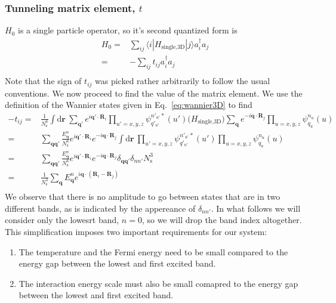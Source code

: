 \documentclass[11pt,letter]{article}
\newcommand{\bv}[1]{\ensuremath{\bm{#1}}}
\begin{document}
\subsubsection{Tunneling matrix element, $t$}
$H_{0}$ is a single particle operator, so it's second quantized form is 
\begin{equation}
\begin{split}
  H_{0} = & \sum_{ij} \langle i| H_{\text{single,3D}} |j \rangle a_{i}^{\dagger} a_{j} \\
        = & -\sum_{ij} t_{ij}  a_{i}^{\dagger} a_{j} \\
\end{split}
\end{equation}  
Note that the sign of $t_{ij}$ was picked rather arbitrarily to follow the
usual conventions.  We now proceed to find the value of the matrix element.
We use the definition of the Wannier states given in Eq.~\ref{eq:wannier3D} to
find 
\begin{equation}
\begin{split}
-t_{ij}  
= & 
  \frac{1}{N_{\mathrm{s}}^{6}}\int \mathrm{d}\bv{r}\ 
     \sum_{\bv{q}'} e^{i \bv{q'}\cdot\bv{R}_{i} }
     \prod_{u'=x,y,z}  \psi_{q'_{u'}}^{n'_{u'}*}(u') 
  \Big( H_{\text{single,3D}}  \Big)
     \sum_{\bv{q}} e^{-i \bv{q}\cdot\bv{R}_{j} }
     \prod_{u=x,y,z}  \psi_{q_{u}}^{n_{u}}(u)\\ 
= &
  \sum_{\bv{q}\bv{q}'}   
  \frac{E_{\bv{q}}^{n}}{N_{\mathrm{s}}^{6}}
   e^{ i \bv{q}'\cdot\bv{R}_{i} }  e^{ -i \bv{q}\cdot\bv{R}_{j} }
   \int\mathrm{d}\bv{r}\ 
     \prod_{u'=x,y,z}  \psi_{q'_{u'}}^{n'_{u'}*}(u') 
     \prod_{u=x,y,z}  \psi_{q_{u}}^{n_{u}}(u) \\ 
= &
  \sum_{\bv{q}\bv{q}'}   
  \frac{E_{\bv{q}}^{n}}{N_{\mathrm{s}}^{6}}
   e^{ i \bv{q}'\cdot\bv{R}_{i} }  e^{ -i \bv{q}\cdot\bv{R}_{j} }
   \delta_{\bv{q}\bv{q}'} \delta_{nn'} N_{\mathrm{s}}^{3} \\
= &
  \frac{1}{N_{\mathrm{s}}^{3}}
  \sum_{\bv{q}}   E_{\bv{q}}^{n}
   e^{ i \bv{q}\cdot(\bv{R}_{i} - \bv{R}_{j}) } \\
\end{split} 
\end{equation}
We observe that there is no amplitude to go between states that are in two different bands, as is indicated by the appereance of $\delta_{nn'}$.   In what follows we will consider only the lowesrt band, $n=0$,  so we will drop the band index altogether.  This simplification imposes two important requirements for our system:
\begin{enumerate}
\item The temperature and the Fermi energy need to be small compared to the energy gap between the lowest and first excited band.   
\item The interaction energy scale must also be small comapred to the energy gap between the lowest and first excited band. 
\end{enumerate}
\end{document}
